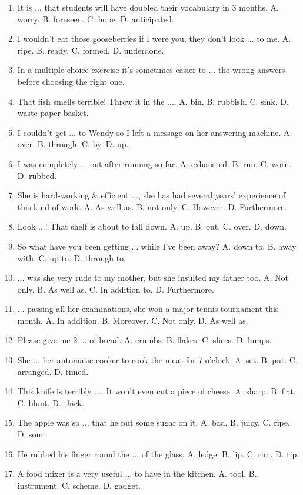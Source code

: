 \documentclass{article}
\numberwithin{equation}{section}
\begin{document}
\begin{enumerate}[leftmargin=2mm]
	\item It is $\ldots$ that students will have doubled their vocabulary in 3 months. A. worry. B. foreseen. C. hope. D. anticipated.
	\item I wouldn't eat those gooseberries if I were you, they don't look $\ldots$ to me. A. ripe. B. ready. C. formed. D. underdone.
	\item In a multiple-choice exercise it's sometimes easier to $\ldots$ the wrong answers before choosing the right one.
	\item That fish smells terrible! Throw it in the $\ldots$. A. bin. B. rubbish. C. sink. D. waste-paper basket.
	\item I couldn't get $\ldots$ to Wendy so I left a message on her answering machine. A. over. B. through. C. by. D. up.
	\item I was completely $\ldots$ out after running so far. A. exhausted. B. run. C. worn. D. rubbed.
	\item She is hard-working \& efficient $\ldots$, she has had several years' experience of this kind of work. A. As well as. B. not only. C. However. D. Furthermore.
	\item Look $\ldots$! That shelf is about to fall down. A. up. B. out. C. over. D. down.
	\item So what have you been getting $\ldots$ while I've been away? A. down to. B. away with. C. up to. D. through to.
	\item $\ldots$ was she very rude to my mother, but she insulted my father too. A. Not only. B. As well as. C. In addition to. D. Furthermore.
	\item $\ldots$ passing all her examinations, she won a major tennis tournament this month. A. In addition. B. Moreover. C. Not only. D. As well as.
	\item Please give me 2 $\ldots$ of bread. A. crumbs. B. flakes. C. slices. D. lumps.
	\item She $\ldots$ her automatic cooker to cook the meat for 7 o'clock. A. set. B. put. C. arranged. D. timed.
	\item This knife is terribly $\ldots$. It won't even cut a piece of cheese. A. sharp. B. flat. C. blunt. D. thick.
	\item The apple was so $\ldots$ that he put some sugar on it. A. bad. B. juicy. C. ripe. D. sour.
	\item He rubbed his finger round the $\ldots$ of the glass. A. ledge. B. lip. C. rim. D. tip.
	\item A food mixer is a very useful $\ldots$ to have in the kitchen. A. tool. B. instrument. C. scheme. D. gadget.

\end{enumerate}
\end{document}
